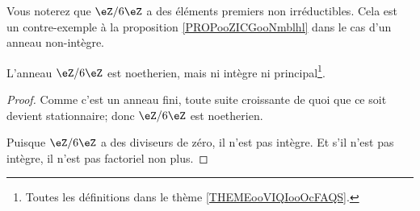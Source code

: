 Vous noterez que \( \eZ/6\eZ\) a des éléments premiers non irréductibles. Cela est un contre-exemple à la proposition \ref{PROPooZICGooNmblhl} dans le cas d'un anneau non-intègre.

\begin{lemma}    \label{LEMooZSELooGOFEIz}
	L'anneau \( \eZ/6\eZ\) est noetherien, mais ni intègre ni principal\footnote{Toutes les définitions dans le thème \ref{THEMEooVIQIooOcFAQS}.}.
\end{lemma}

\begin{proof}
	Comme c'est un anneau fini, toute suite croissante de quoi que ce soit devient stationnaire; donc \( \eZ/6\eZ\) est noetherien.

	Puisque \( \eZ/6\eZ\) a des diviseurs de zéro, il n'est pas intègre. Et s'il n'est pas intègre, il n'est pas factoriel non plus.
\end{proof}
